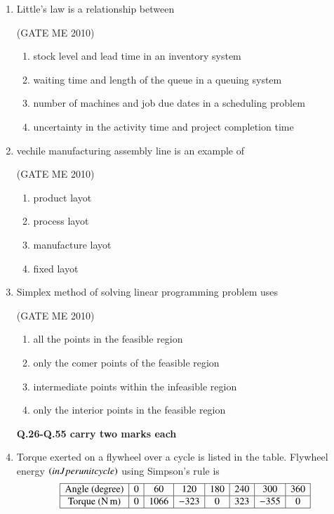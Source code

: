 \documentclass[journal,12pt,onecolumn]{IEEEtran}
\theoremstyle{remark}
\begin{document}
\begin{enumerate}
\item Little's law is a relationship between

  \hfill{(GATE ME 2010)}\\
  
\begin{enumerate}

\item stock level and lead time in an inventory system
\item waiting time and length of the queue in a queuing system
\item number of machines and job due dates in a scheduling problem
\item uncertainty in the activity time and project completion time
\end{enumerate}
 


\item vechile manufacturing assembly line is an example of

  \hfill{(GATE ME 2010)}\\
  
\begin{multicols}{2}
    \begin{enumerate}
        \item product layot
        \item process layot
        \item manufacture layot
        \item fixed layot
    \end{enumerate}
\end{multicols}


\item Simplex method of solving linear programming problem uses

  \hfill{(GATE ME 2010)}\\
 
    \begin{enumerate}

\item all the points in the feasible region
\item  only the comer points of the feasible region
\item  intermediate points within the infeasible region
\item  only the interior points in the feasible region
  \end{enumerate}
 

\textbf{Q.26-Q.55 carry two marks each }

\item Torque exerted on a flywheel over a cycle is listed in the table. Flywheel energy $\left(in J per unit cycle\right)$ using Simpson's rule is 
\[
\begin{array}{|c|c|c|c|c|c|c|c|c|}
\hline
\text{Angle (degree)} & 0 & 60 & 120 & 180 & 240 & 300 & 360 \\
\hline
\text{Torque (N\,m)} & 0 & 1066 & -323 & 0 & 323 & -355 & 0 \\
\hline
\end{array}
\]


\end{enumerate}
\end{document}
